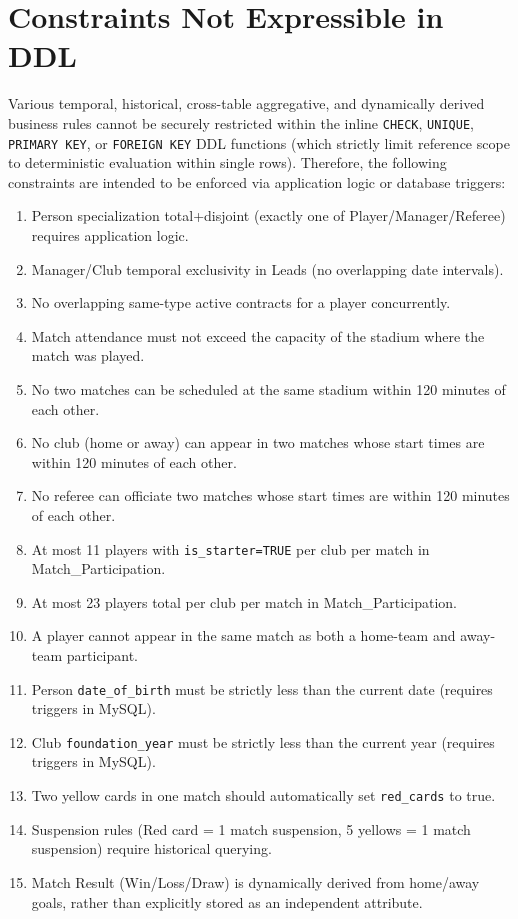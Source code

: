 \documentclass[12pt, a4paper]{article}
\begin{document}
\newpage
\section{Constraints Not Expressible in DDL}

Various temporal, historical, cross-table aggregative, and dynamically derived business rules cannot be securely restricted within the inline \texttt{CHECK}, \texttt{UNIQUE}, \texttt{PRIMARY KEY}, or \texttt{FOREIGN KEY} DDL functions (which strictly limit reference scope to deterministic evaluation within single rows). Therefore, the following constraints are intended to be enforced via application logic or database triggers:

\begin{enumerate}
    \item Person specialization total+disjoint (exactly one of Player/Manager/Referee) requires application logic.
    \item Manager/Club temporal exclusivity in Leads (no overlapping date intervals).
    \item No overlapping same-type active contracts for a player concurrently.
    \item Match attendance must not exceed the capacity of the stadium where the match was played.
    \item No two matches can be scheduled at the same stadium within 120 minutes of each other.
    \item No club (home or away) can appear in two matches whose start times are within 120 minutes of each other.
    \item No referee can officiate two matches whose start times are within 120 minutes of each other.
    \item At most 11 players with \texttt{is\_starter=TRUE} per club per match in Match\_Participation.
    \item At most 23 players total per club per match in Match\_Participation.
    \item A player cannot appear in the same match as both a home-team and away-team participant.
    \item Person \texttt{date\_of\_birth} must be strictly less than the current date (requires triggers in MySQL).
    \item Club \texttt{foundation\_year} must be strictly less than the current year (requires triggers in MySQL).
    \item Two yellow cards in one match should automatically set \texttt{red\_cards} to true.
    \item Suspension rules (Red card = 1 match suspension, 5 yellows = 1 match suspension) require historical querying.
    \item Match Result (Win/Loss/Draw) is dynamically derived from home/away goals, rather than explicitly stored as an independent attribute.
\end{enumerate}
\end{document}
